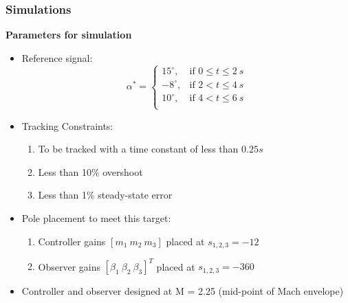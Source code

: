 \documentclass[table,10pt,red]{beamer}	%
\begin{document}
\begin{frame}
\frametitle{Simulations}
\textbf{Parameters for simulation}
\begin{itemize}  %
		\item Reference signal: \\  
		\begin{equation}
			\alpha^{*}=
			\begin{cases}
			15^{\circ}, & \text{if $0 \leq t \leq2 ~ s$}\\
			-8^{\circ}, & \text{if $2 < t \leq4 ~ s$}\\
			10^{\circ}, & \text{if $4 < t \leq6 ~ s$} \label{ref_sig}\\ 
			\end{cases} \nonumber
		\end{equation}
		\item Tracking Constraints:
		\begin{enumerate}
			\item To be tracked with a time constant of less than $0.25s$
			\item Less than 10\% overshoot
			\item Less than 1\% steady-state error
		\end{enumerate}
		\item Pole placement to meet this target:
		\begin{enumerate}
			\item Controller gains $[m_1\ m_2 \ m_3]$ placed at $s_{1,2,3} = -12$
			\item Observer gains $[\beta_1 \ \beta_2 \ \beta_3]^T$ placed at $s_{1,2,3} = -360$
		\end{enumerate}
	
		\item Controller and observer designed at M = 2.25 (mid-point of Mach envelope)
	\end{itemize}

\end{frame}
\end{document}
